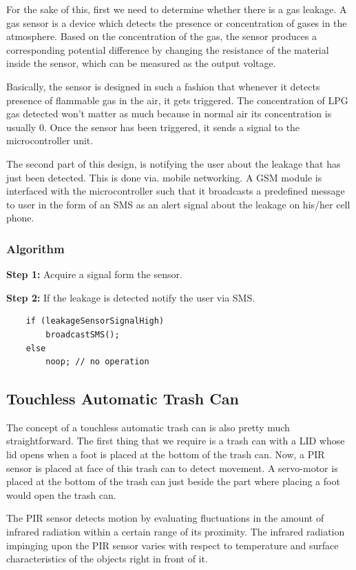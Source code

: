 For the sake of this, first we need to determine whether there is a
gas leakage. A gas sensor is a device which detects the presence or
concentration of gases in the atmosphere. Based on the concentration
of the gas, the sensor produces a corresponding potential difference
by changing the resistance of the material inside the sensor, which
can be measured as the output voltage.

Basically, the sensor is designed in such a fashion that whenever it
detects presence of flammable gas in the air, it gets triggered. The
concentration of LPG gas detected won't matter as much because in
normal air its concentration is usually 0. Once the sensor has been
triggered, it sends a signal to the microcontroller unit.

The second part of this design, is notifying the user about the
leakage that has just been detected. This is done via. mobile
networking. A GSM module is interfaced with the microcontroller such
that it broadcasts a predefined message to user in the form of an SMS
as an alert signal about the leakage on his/her cell phone.

\subsubsection{Algorithm}

\textbf{Step 1:} Acquire a signal form the sensor.

\textbf{Step 2:} If the leakage is detected notify the user via SMS.

\begin{verbatim}
    if (leakageSensorSignalHigh)
        broadcastSMS();
    else
        noop; // no operation
\end{verbatim}

\vfill \newpage
\subsection{Touchless Automatic Trash Can}

The concept of a touchless automatic trash can is also pretty much
straightforward. The first thing that we require is a trash can with a
LID whose lid opens when a foot is placed at the bottom of the trash
can. Now, a PIR sensor is placed at face of this trash can to detect
movement. A servo-motor is placed at the bottom of the trash can just
beside the part where placing a foot would open the trash can.

The PIR sensor detects motion by evaluating fluctuations in the amount
of infrared radiation within a certain range of its proximity. The
infrared radiation impinging upon the PIR sensor varies with respect
to temperature and surface characteristics of the objects right in
front of it.

